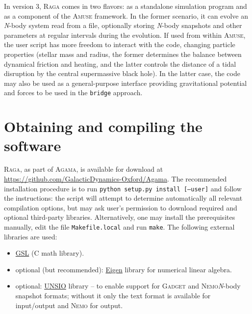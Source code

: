 \documentclass[12pt]{article}
\newcommand{\Nbody}{\textsl{N}-body\xspace}
\newcommand{\Raga}{\textsc{Raga}\xspace}
\newcommand{\Agama}{\textsc{Agama}\xspace}
\newcommand{\Amuse}{\textsc{Amuse}\xspace}
\newcommand{\Nemo}{\textsc{Nemo}\xspace}
\begin{document}
In version 3, \Raga comes in two flavors: as a standalone simulation program and as a component of the \Amuse framework. In the former scenario, it can evolve an \Nbody system read from a file, optionally storing \Nbody snapshots and other parameters at regular intervals during the evolution. If used from within \Amuse, the user script has more freedom to interact with the code, changing particle properties (stellar mass and radius, the former determines the balance between dynamical friction and heating, and the latter controls the distance of a tidal disruption by the central supermassive black hole). In the latter case, the code may also be used as a general-purpose interface providing gravitational potential and forces to be used in the \texttt{bridge} approach.


\section{Obtaining and compiling the software}

\Raga, as part of \Agama, is available for download at\\ \url{https://github.com/GalacticDynamics-Oxford/Agama}. The recommended installation procedure is to run \texttt{python setup.py install [--user]} and follow the instructions: the script will attempt to determine automatically all relevant compilation options, but may ask user's permission to download required and optional third-party libraries. Alternatively, one may install the prerequisites manually, edit the file \texttt{Makefile.local} and run \texttt{make}. The following external libraries are used:
\begin{itemize}
\item \href{http://www.gnu.org/software/gsl/}{GSL} (C math library).
\item optional (but recommended): \href{http://eigen.tuxfamily.org/}{Eigen} library for numerical linear algebra.
\item optional: \href{http://projets.lam.fr/projects/unsio/}{UNSIO} library -- to enable support for \textsc{Gadget} and \Nemo \Nbody snapshot formats; without it only the text format is available for input/output and \Nemo for output.
\end{itemize}
\end{document}
